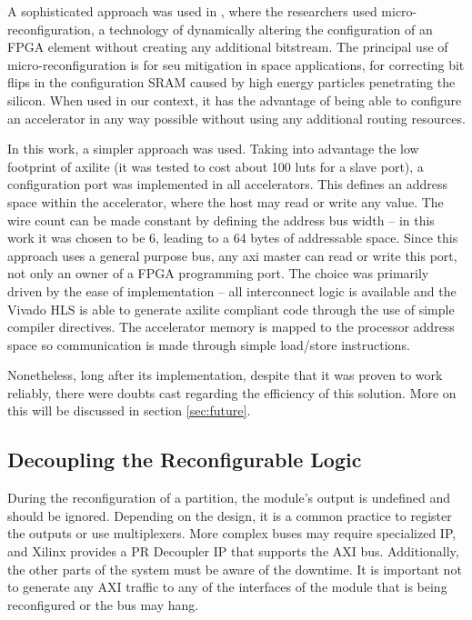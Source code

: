 A sophisticated approach was used in \cite{charitopoulos}, where the researchers used
micro-reconfiguration, a technology of dynamically altering the configuration of an
FPGA element without creating any additional bitstream.
The principal use of micro-reconfiguration is for \gls{seu} mitigation in space applications,
for correcting bit flips in the configuration SRAM caused by high energy particles
penetrating the silicon.
When used in our context, it has the advantage of being able to configure an
accelerator in any way possible without using any additional routing resources.

In this work, a simpler approach was used. Taking into advantage the low footprint of
\gls{axilite} (it was tested to cost about 100 \glspl{lut} for a slave port),
a configuration port was implemented in all accelerators. This defines
an address space within the accelerator, where the host may read or write any value.
The wire count can be made constant by defining the address bus width -- in this work
it was chosen to be 6, leading to a 64 bytes of addressable space. Since this approach
uses a general purpose bus, any \gls{axi} master can read or write this port,
not only an owner of a FPGA programming port. The choice was primarily driven by
the ease of implementation -- all interconnect logic is available and the Vivado HLS
is able to generate \gls{axilite} compliant code through the use of simple compiler
directives. The accelerator memory is mapped to the processor address space
so communication is made through simple load/store instructions.

Nonetheless, long after its implementation, despite that it was proven to work reliably,
there were doubts cast regarding the efficiency of this solution.
More on this will be discussed in section \ref{sec:future}.

\subsection{Decoupling the Reconfigurable Logic}

During the reconfiguration of a partition, the module's output is undefined and should be ignored.
Depending on the design, it is a common practice to register the outputs or use multiplexers.
More complex buses may require specialized IP, and Xilinx provides a PR Decoupler IP that
supports the AXI bus. Additionally, the other parts of the system must be aware of the downtime.
It is important not to generate any AXI traffic to any of the interfaces of the module that is
being reconfigured or the bus may hang.

